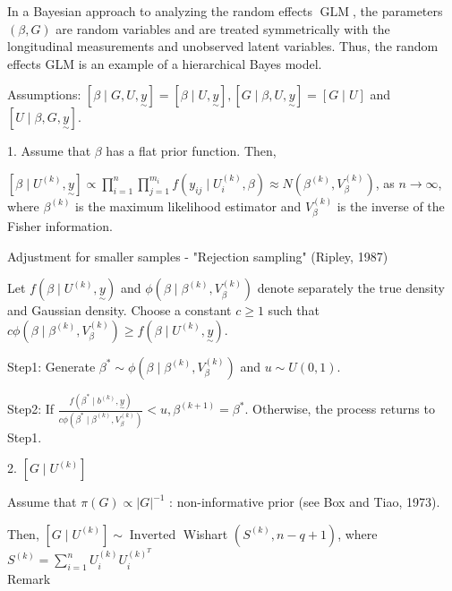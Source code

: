 \documentclass[UTF8,a4paper,10pt]{article}
\begin{document}
{{{%

In a Bayesian approach to analyzing the random effects $\operatorname{GLM}$, the parameters $(\beta, G)$ are random variables and are treated symmetrically with the longitudinal measurements and unobserved latent variables. Thus, the random effects GLM is an example of a hierarchical Bayes model.

Assumptions: $[\beta \mid G, U, \underset{\sim}{y}]=[\beta \mid U, \underset{\sim}{y}],[G \mid \beta, U, \underset{\sim}{y}]=[G \mid U]$ and $[U \mid \beta, G, \underset{\sim}{y}]$.

1. Assume that $\beta$ has a flat prior function. Then,

$\left[\beta \mid U^{(k)}, \underset{\sim}{y}\right] \propto \prod_{i=1}^{n} \prod_{j=1}^{m_{i}} f\left(y_{i j} \mid U_{i}^{(k)}, \beta\right) \approx N\left(\beta^{(k)}, V_{\beta}^{(k)}\right)$, as $n \rightarrow \infty$, where $\beta^{(k)}$ is the maximum likelihood estimator and $V_{\beta}^{(k)}$ is the inverse of the Fisher information.

Adjustment for smaller samples - "Rejection sampling" (Ripley, 1987)

Let $f\left(\beta \mid U^{(k)}, \underset{\sim}{y}\right)$ and $\phi\left(\beta \mid \beta^{(k)}, V_{\beta}^{(k)}\right)$ denote separately the true density and Gaussian density. Choose a constant $c \geq 1$ such that $c \phi\left(\beta \mid \beta^{(k)}, V_{\beta}^{(k)}\right) \geq f\left(\beta \mid U^{(k)}, \underset{\sim}{y}\right)$.

Step1: Generate $\beta^{*} \sim \phi\left(\beta \mid \beta^{(k)}, V_{\beta}^{(k)}\right)$ and $u \sim U(0,1)$.

Step2: If $\frac{f\left(\beta^{*} \mid b^{(k)}, \underset{\sim}{y}\right)}{c \phi\left(\beta^{*} \mid \beta^{(k)}, V_{\beta}^{(k)}\right)}<u, \beta^{(k+1)}=\beta^{*}$. Otherwise, the process returns to Step1.

2. $\left[G \mid U^{(k)}\right]$

Assume that $\pi(G) \propto|G|^{-1}$ : non-informative prior (see Box and Tiao, 1973). 

Then, $\left[G \mid U^{(k)}\right] \sim \operatorname{Inverted}$ Wishart $\left(S^{(k)}, n-q+1\right)$, where $S^{(k)}=\sum_{i=1}^{n} U_{i}^{(k)} U_{i}^{(k)^{T}}$
\\

Remark

}}}
\end{document}
